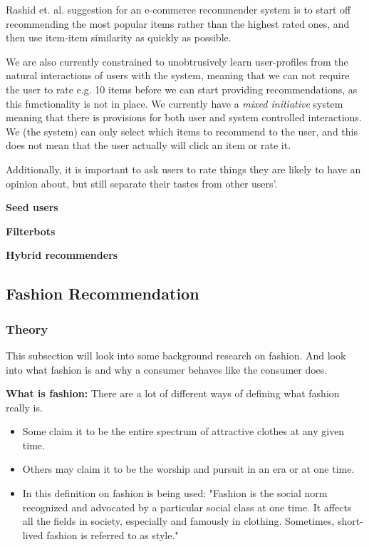 Rashid et. al. \cite{Rashid2002} suggestion for an e-commerce recommender system is to start off recommending the most popular
items rather than the highest rated ones, and then use item-item similarity as quickly as possible.

We are also currently constrained to unobtrusively learn user-profiles from the natural interactions of users with the system, meaning that we can not require the user to rate e.g. 10 items before we can start providing recommendations, as this functionality is not in place. We
currently have a \emph{mixed initiative} system meaning that there is
provisions for both user and system controlled interactions. We (the system)
can only select which items to recommend to the user, and this does not mean
that the user actually will click an item or rate it.

Additionally, it is important to ask users to rate things they
are likely to have an opinion about, but still separate their tastes from other users’.

\textbf{Seed users}


\textbf{Filterbots}



\textbf{Hybrid recommenders}


\subsection{Fashion Recommendation}

\subsubsection{Theory}
This subsection will look into some background research on fashion.
And look into what fashion is and why a consumer behaves like the consumer does.

\textbf{What is fashion:}
There are a lot of different ways of defining what fashion really is.

\begin{itemize}
    \item Some claim it to be the entire spectrum of attractive clothes at any given time.
    \item Others may claim it to be the worship and pursuit in an era or at one
    time.
    \item In \cite{Fang2012} this definition on fashion is being used: "Fashion is
    the social norm recognized and advocated by a particular social class at one
    time. It affects all the fields in society, especially and famously in
    clothing. Sometimes, short-lived fashion is referred to as style."
    \label{items:fashionDefinitions}
\end{itemize}


